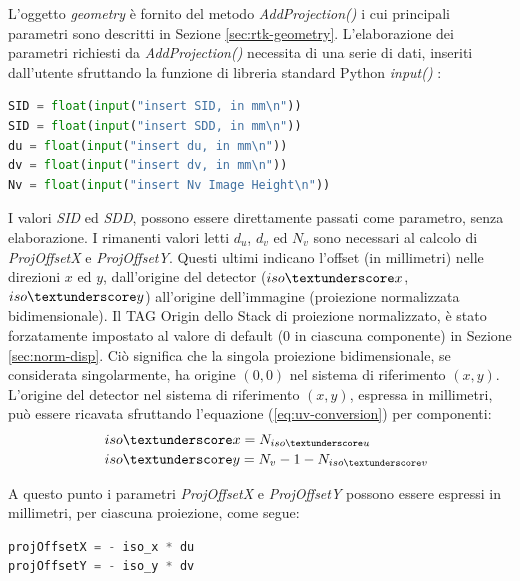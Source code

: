 \documentclass[a4paper,12pt, doubleside]{report}
\begin{document}
                    L'oggetto \textit{geometry} è fornito del metodo \textit{AddProjection()} i cui principali parametri sono descritti in Sezione \ref{sec:rtk-geometry}. L'elaborazione dei parametri richiesti da \textit{AddProjection()} necessita di una serie di dati, inseriti dall'utente sfruttando la funzione di libreria standard Python \textit{input()} \cite{input-python}:
                    
                    \begin{lstlisting}[language=python, frame=bt]
SID = float(input("insert SID, in mm\n"))
SID = float(input("insert SDD, in mm\n"))
du = float(input("insert du, in mm\n"))
dv = float(input("insert dv, in mm\n"))
Nv = float(input("insert Nv Image Height\n"))
                    \end{lstlisting}
                    
                    I valori \textit{SID} ed \textit{SDD}, possono essere direttamente passati come parametro, senza elaborazione. I rimanenti valori letti $d_u$, $d_v$ ed $N_v$ sono necessari al calcolo di \textit{ProjOffsetX} e \textit{ProjOffsetY}. Questi ultimi indicano l'offset (in millimetri) nelle direzioni $x$ ed $y$, dall'origine del detector ($iso\textunderscore x$, $iso\textunderscore y$) all'origine dell'immagine (proiezione normalizzata bidimensionale). Il TAG Origin dello Stack di proiezione normalizzato, è stato forzatamente impostato al valore di default ($0$ in ciascuna componente) in Sezione \ref{sec:norm-disp}. Ciò significa che la singola proiezione bidimensionale, se considerata singolarmente, ha origine $(0,0)$ nel sistema di riferimento $(x,y)$. L'origine del detector nel sistema di riferimento $(x,y)$, espressa in millimetri, può essere ricavata sfruttando l'equazione (\ref{eq:uv-conversion}) per componenti:
                    \begin{equation}
                        \begin{multlined}
                        \ \ \ iso\textunderscore x = N_{iso\textunderscore u} \\
                        iso\textunderscore y = N_v - 1 - N_{iso\textunderscore v}
                        \end{multlined}
                    \end{equation}
                    
                    A questo punto i parametri \textit{ProjOffsetX} e \textit{ProjOffsetY} possono essere espressi in millimetri, per ciascuna proiezione, come segue:
                    \begin{lstlisting}[language=python, frame=bt]
projOffsetX = - iso_x * du
projOffsetY = - iso_y * dv
                    \end{lstlisting}
                    
\end{document}
